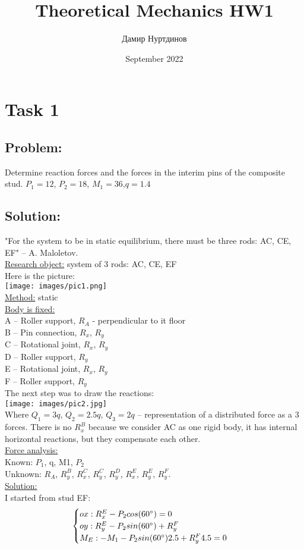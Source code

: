 \documentclass[a4paper,11pt,oneside,article]{memoir}
\title{Theoretical Mechanics HW1}
\author{Дамир Нуртдинов}
\date{September 2022}
\begin{document}
\section*{Task 1}
\subsection{Problem:}
Determine reaction forces and the forces in the interim pins of the composite stud. $P_1 = 12$, $P_2 = 18$, $M_1 = 36$,$q = 1.4$ 
\subsection{Solution:}
"For the system to be in static equilibrium, there must be three rods: AC, CE, EF" – A. Maloletov.\\
\underline{Research object:} system of 3 rods: AC, CE, EF\\
Here is the picture:\\
\texttt{[image: images/pic1.png]}\\
\underline{Method:} static\\
\underline{Body is fixed:}\\
A – Roller support, $R_A$ - perpendicular to it floor \\
B – Pin connection, $R_x$, $R_y$\\
C – Rotational joint, $R_x$, $R_y$\\
D – Roller support, $R_y$\\
E – Rotational joint, $R_x$, $R_y$\\
F – Roller support, $R_y$\\
The next step was to draw the reactions:\\
\texttt{[image: images/pic2.jpg]}\\
Where $Q_1 = 3q$, $Q_2 = 2.5q$, $Q_3 = 2q$ – representation of a distributed force as a 3 forces. There is no $R^B_x$ because we consider AC as one rigid body, it has internal horizontal reactions, but they compensate each other. \\
\underline{Force analysis:}\\
Known: $P_1$, q, M1, $P_2$\\
Unknown: $R_A$, $R^B_y$, $R^C_x$, $R^C_y$, $R^D_y$, $R^E_x$, $R^E_y$, $R^F_y$.\\
\underline{Solution:}\\
I started from stud EF:\\
\begin{equation}
    \begin{cases}
    ox: R^E_x - P_2 cos(60\degree) = 0\\
    oy: R^E_y - P_2 sin(60\degree) + R^F_y\\
    M_E: -M_1 - P_2 sin(60\degree) 2.5 + R^F_y 4.5 = 0
     \end{cases}
\end{equation}
\end{document}
